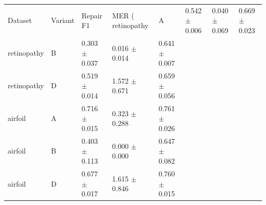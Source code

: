 \begin{tabular}{lllll}
\hline
Dataset & Variant & Repair F1 & MER (%
\hline
retinopathy & A & 0.542 $\pm$ 0.006 & 0.040 $\pm$ 0.069 & 0.669 $\pm$ 0.023 \\
retinopathy & B & 0.303 $\pm$ 0.037 & 0.016 $\pm$ 0.014 & 0.641 $\pm$ 0.007 \\
retinopathy & D & 0.519 $\pm$ 0.014 & 1.572 $\pm$ 0.671 & 0.659 $\pm$ 0.056 \\
airfoil & A & 0.716 $\pm$ 0.015 & 0.323 $\pm$ 0.288 & 0.761 $\pm$ 0.026 \\
airfoil & B & 0.403 $\pm$ 0.113 & 0.000 $\pm$ 0.000 & 0.647 $\pm$ 0.082 \\
airfoil & D & 0.677 $\pm$ 0.017 & 1.615 $\pm$ 0.846 & 0.760 $\pm$ 0.015 \\
\hline
\end{tabular}
